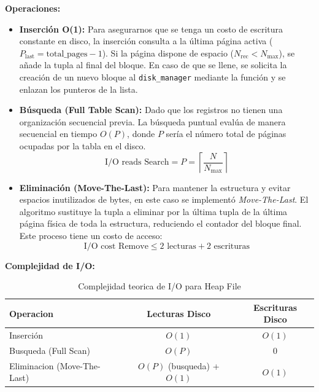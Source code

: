 \documentclass[a4paper,12pt]{article}
\begin{document}
\textbf{Operaciones:}
\begin{itemize}
    \item \textbf{Inserción O(1):} Para asegurarnos que se tenga un costo de escritura constante en disco, la inserción consulta a la última página activa ($P_{\text{last}} = \text{total\_pages} - 1$). Si la página dispone de espacio ($N_{\text{rec}} < N_{\text{max}}$), se añade la tupla al final del bloque. En caso de que se llene, se solicita la creación de un nuevo bloque al \texttt{disk\_manager} mediante la función  y se enlazan los punteros de la lista.
    \item \textbf{Búsqueda (Full Table Scan):} Dado que los registros no tienen una organización secuencial previa. La búsqueda puntual evalúa de manera secuencial en tiempo $O(P)$, donde $P$ sería el número total de páginas ocupadas por la tabla en el disco.
    \begin{equation}
        \text{I/O reads Search} = P = \left\lceil \frac{N}{N_{\text{max}}} \right\rceil
    \end{equation}
    \item \textbf{Eliminación (Move-The-Last):} Para mantener la estructura y evitar espacios inutilizados de bytes, en este caso se implementó \textit{Move-The-Last}. El algoritmo sustituye la tupla a eliminar por la última tupla de la última página física de toda la estructura, reduciendo el contador del bloque final. Este proceso tiene un costo de acceso:
        \begin{equation}
            \text{I/O cost Remove} \le 2 \text{ lecturas} + 2 \text{ escrituras}
        \end{equation}
\end{itemize}


\textbf{Complejidad de I/O:}
\begin{table}[h]
\centering
\caption{Complejidad teorica de I/O para Heap File}
\label{tab:heap_complejidad}
\begin{tabular}{|l|c|c|}
\hline
\textbf{Operacion} & \textbf{Lecturas Disco} & \textbf{Escrituras Disco} \\ \hline
Inserción & $O(1)$ & $O(1)$ \\ \hline
Busqueda (Full Scan) & $O(P)$ & $0$ \\ \hline
Eliminacion (Move-The-Last) & $O(P)$ (busqueda) + $O(1)$ & $O(1)$ \\ \hline
\end{tabular}
\end{table}
\end{document}
